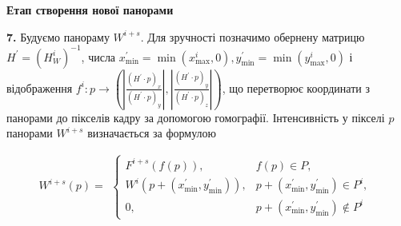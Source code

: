 \begin{algorithm}[H]
\begin{algorithmic}
        \textbf{Етап створення нової панорами}
        
        \textbf{7.}
        Будуємо панораму $W^{i+s}$. Для зручності позначимо обернену матрицю $H^{'} = (H_{W}^{i})^{-1}$, числа
        $x_{\min}^{'} = \min(x_{\max}^{i}, 0), y_{\min}^{'} = \min(y_{\max}^{i}, 0)$ і відображення
        $f^i: p \rightarrow
            (|\frac{(H^{'} \cdot p)_x}{(H^{'} \cdot p)_y}|, |\frac{(H^{'} \cdot p)_y}{(H^{'} \cdot p)_z}|)$, що перетворює
        координати з панорами до пікселів кадру за допомогою гомографії. Інтенсивність у пікселі $p$ панорами
        $W^{i+s}$ визначається за формулою

        \begin{equation*}
            W^{i + s}(p) =
            \begin{gathered}
                \begin{cases}
                    F^{i + s}(f(p)),                            & f(p) \in P,                                    \\
                    W^{i}( p + ( x_{\min}^{'},y_{\min}^{'} ) ), & p + ( x_{\min}^{'},y_{\min}^{'} ) \in P^{i},   \\
                    0,                                          & p + ( x_{\min}^{'},y_{\min}^{'} ) \notin P^{i}
                \end{cases}
            \end{gathered}
        \end{equation*}
    \end{algorithmic}
    \label{al:panorama_creating_algorithm}
\end{algorithm}

\clearpage
